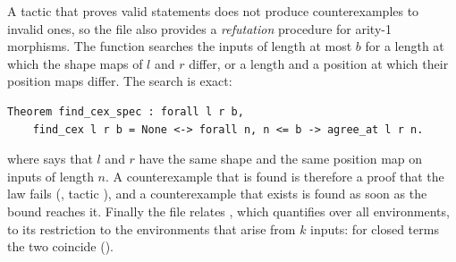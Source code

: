 \documentclass{fundam}
\begin{document}
A tactic that proves valid statements does not produce counterexamples to invalid ones,
so the file also provides a \emph{refutation} procedure for arity-1 morphisms.  The
function  searches the inputs of length at most $b$ for a length at
which the shape maps of $l$ and $r$ differ, or a length and a position at which their
position maps differ.  The search is exact:
\begin{lstlisting}
Theorem find_cex_spec : forall l r b,
    find_cex l r b = None <-> forall n, n <= b -> agree_at l r n.
\end{lstlisting}
where  says that $l$ and $r$ have the same shape and the same
position map on inputs of length $n$.  A counterexample that is found is therefore a
proof that the law fails (, tactic ), and a
counterexample that exists is found as soon as the bound reaches it.  Finally the file
relates , which quantifies over all environments, to its restriction to the
environments that arise from $k$ inputs: for closed terms the two coincide
().
\end{document}
